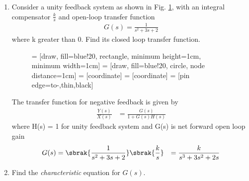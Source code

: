 \begin{enumerate}[label=\thesection.\arabic*.,ref=\thesection.\theenumi]

\item
Consider a unity feedback system as shown in Fig.  \ref{fig:ee18btech11005}, with an integral compensator $\frac{k}{s}$ and open-loop transfer function
\begin{align}
G(s) = \frac{1}{s^2+3s+2}
\end{align}
where k greater than 0. 
%
Find its closed loop transfer function.
\begin{figure}[!ht]
 = [draw, fill=blue!20, rectangle, 
    minimum height=1cm, minimum width=1cm]
 = [draw, fill=blue!20, circle, node distance=1cm]
 = [coordinate]
 = [coordinate]
 = [pin edge={to-,thin,black}]

\caption{}
\label{fig:ee18btech11005}
\end{figure}

\solution The transfer function for negative feedback is given by
\begin{align}
\frac{Y(s)}{X(s)} &= \frac{G(s)}{1+G(s)H(s)}
\end{align}
where H(s) = 1 for unity feedback system
and G(s) is net forward open loop gain
\begin{align}
G(s) &=  \sbrak{\frac{1}{s^2+3s+2}}\sbrak{\frac{k}{s}}
&= \frac{k}{s^3+3s^2+2s}
\end{align}
\item Find the {\em characteristic} equation for $G(s)$.


\end{enumerate}
